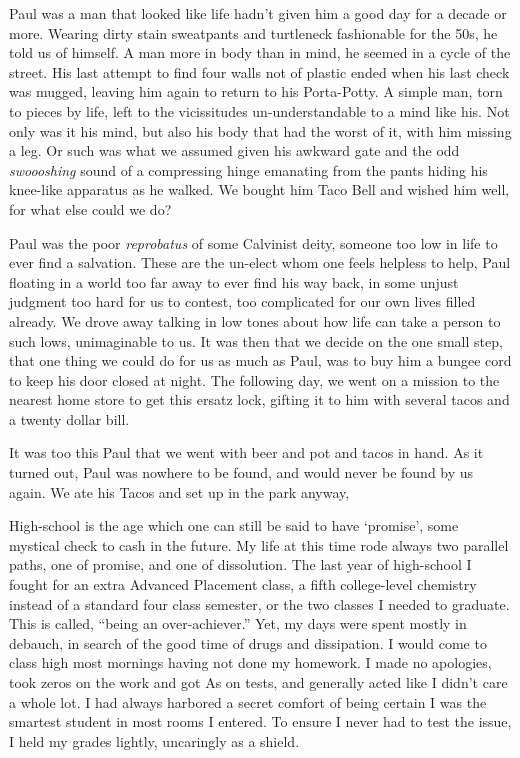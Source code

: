 \documentclass[ebook, 10pt, openright, onecolumn]{memoir}
\begin{document}
Paul was a man that looked like life hadn't given him a good day for a decade or
more.  Wearing dirty stain sweatpants and turtleneck fashionable for the 50s, he
told us of himself.  A man more in body than in mind, he seemed in a cycle of
the street.  His last attempt to find four walls not of plastic ended when his
last check was mugged, leaving him again to return to his Porta-Potty.  A simple
man, torn to pieces by life, left to the vicissitudes un-understandable to a
mind like his. Not only was it his mind, but also his body that had the worst of
it, with him missing a leg. Or such was what we assumed given his awkward gate
and the odd \textit{swoooshing} sound of a compressing hinge emanating from the
pants hiding his knee-like apparatus as he walked.  We bought him Taco Bell and
wished him well, for what else could we do?

Paul was the poor \textit{reprobatus} of some Calvinist deity, someone too low
in life to ever find a salvation.  These are the un-elect whom one feels helpless to
help, Paul floating in a world too far away to ever find his way back, in some unjust
judgment too hard for us to contest, too complicated for our own lives filled
already.  We drove away talking in low tones about how life can take a person to
such lows, unimaginable to us.  It was then that we decide on the one small
step, that one thing we could do for us as much as Paul, was to buy him a bungee
cord to keep his door closed at night.  The following day, we went on a mission
to the nearest home store to get this ersatz lock, gifting it to him with
several tacos and a twenty dollar bill.

It was too this Paul that we went with beer and pot and tacos in hand.  As it
turned out, Paul was nowhere to be found, and would never be found by us again.
We ate his Tacos and set up in the park anyway,


High-school is the age which one can still be said to have `promise', some
mystical check to cash in the future.  My life at this time rode always two
parallel paths, one of promise, and one of dissolution.  The last year of
high-school I fought for an extra Advanced Placement class, a fifth
college-level chemistry instead of a standard four class semester, or the two
classes I needed to graduate. This is called, ``being an over-achiever.''  Yet,
my days were spent mostly in debauch, in search of the good time of drugs
and dissipation.  I would come to class high most mornings having not done my
homework.  I made no apologies, took zeros on the work and got As on tests, and
generally acted like I didn't care a whole lot.  I had always harbored a secret
comfort of being certain I was the smartest student in most rooms I entered.
To ensure I never had to  test the issue, I held my grades lightly, uncaringly
as a shield.  
\end{document}
